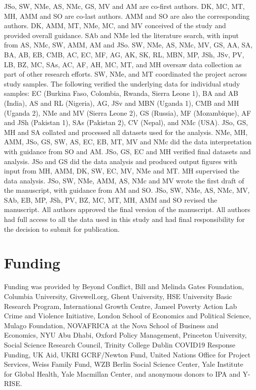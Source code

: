 \documentclass[
  12pt,
]{article}
\begin{document}
JSo, SW, NMe, AS, NMc, GS, MV and AM are co-first authors. DK, MC, MT, MH, AMM and SO are co-last authors. AMM and SO are also the corresponding authors.
DK, AMM, MT, NMe, MC, and MV conceived of the study and provided overall guidance.
SAb and NMe led the literature search, with input from AS, NMc, SW, AMM, AM and JSo.
SW, NMe, AS, NMc, MV, GS, AA, SA, BA, AB, EB, CMB, AC, EC, MF, AG, AK, SK, RL, MBN, MP, JSh, JSv, PV, LB, BZ, MC, SAs, AC, AF, AH, MC, MT, and MH oversaw data collection as part of other research efforts.
SW, NMe, and MT coordinated the project across study samples.
The following verified the underlying data for individual study samples: EC (Burkina Faso, Colombia, Rwanda, Sierra Leone 1), BA and AB (India), AS and RL (Nigeria), AG, JSv and MBN (Uganda 1), CMB and MH (Uganda 2), NMe and MV (Sierra Leone 2), GS (Russia), MF (Mozambique), AF and JSh (Pakistan 1), SAs (Pakistan 2), CV (Nepal), and NMc (USA).
JSo, GS, MH and SA collated and processed all datasets used for the analysis.
NMe, MH, AMM, JSo, GS, SW, AS, EC, EB, MT, MV and NMc did the data interpretation with guidance from SO and AM.
JSo, GS, EC and MH verified final datasets and analysis.
JSo and GS did the data analysis and produced output figures with input from MH, AMM, DK, SW, EC, MV, NMe and MT.
MH supervised the data analysis.
JSo, SW, NMe, AMM, AS, NMc and MV wrote the first draft of the manuscript, with guidance from AM and SO.
JSo, SW, NMe, AS, NMc, MV, SAb, EB, MP, JSh, PV, BZ, MC, MT, MH, AMM and SO revised the manuscript.
All authors approved the final version of the manuscript. All authors had full access to all the data used in this study and had final responsibility for the decision to submit for publication.

\hypertarget{funding}{%
\section*{Funding}\label{funding}}

Funding was provided by Beyond Conflict, Bill and Melinda Gates Foundation, Columbia University, Givewell.org, Ghent University, HSE University Basic Research Program, International Growth Centre, Jameel Poverty Action Lab Crime and Violence Initiative, London School of Economics and Political Science, Mulago Foundation, NOVAFRICA at the Nova School of Business and Economics, NYU Abu Dhabi, Oxford Policy Management, Princeton University, Social Science Research Council, Trinity College Dublin COVID19 Response Funding, UK Aid, UKRI GCRF/Newton Fund, United Nations Office for Project Services, Weiss Family Fund, WZB Berlin Social Science Center, Yale Institute for Global Health, Yale Macmillan Center, and anonymous donors to IPA and Y-RISE.
\end{document}
